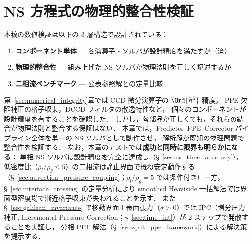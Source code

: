 %
%
\section{NS 方程式の物理的整合性検証}
\label{sec:verification}

本稿の数値検証は以下の 3 層構造で設計されている：
\begin{enumerate}[noitemsep]
  \item[\textbf{第~\ref{sec:numerical_integrity}章}]
    \textbf{コンポーネント単体} — 各演算子・ソルバが設計精度を満たすか（済）
  \item[\textbf{本章}]
    \textbf{物理的整合性} — 組み上げた NS ソルバが物理法則を正しく記述するか
  \item[\textbf{第~\ref{sec:validation}章}]
    \textbf{二相流ベンチマーク} — 公表参照解との定量比較
\end{enumerate}
第~\ref{sec:numerical_integrity}章では CCD 微分演算子の $\Ord{h^6}$ 精度，
PPE 欠陥補正の格子収束，DCCD フィルタの散逸特性など，
個々のコンポーネントが設計精度を有することを確認した．
しかし，各部品が正しくても，それらの結合が物理法則と整合する保証はない．
本章では，Predictor--PPE--Corrector パイプライン全体を単一の NS ソルバとして動作させ，
解析解が既知の物理問題で整合性を検証する．
なお，本章のテストでは\textbf{成功と同時に限界も明らかになる}：
単相 NS ソルバは設計精度を完全に達成し（§~\ref{sec:ns_time_accuracy}），
低密度比（$\rho_l/\rho_g \leq 5$）の二相流は静止界面で概ね安定動作する
（§~\ref{sec:advection_pressure_coupling}；$\rho_l/\rho_g{=}5$ では条件付き）一方，
§~\ref{sec:interface_crossing} の定量分析により
smoothed Heaviside 一括解法では界面型密度場で漸近格子収束が失われることを示す．
また §~\ref{sec:galilean_invariance} で移動界面＋表面張力（$\sigma > 0$）では
IPC（増分圧力補正, Incremental Pressure Correction；§~\ref{sec:time_int}）が
2 ステップで発散することを実証し，
分相 PPE 解法（§~\ref{sec:split_ppe_framework}）による解決策を提示する．

